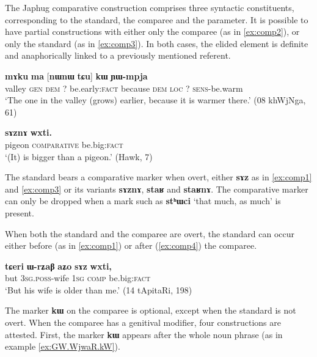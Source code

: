 \documentclass[oldfontcommands,oneside,a4paper,11pt]{article}
\newcommand{\ipa}[1]{{\phon\textbf{#1}}}
\begin{document}
 

The Japhug comparative construction comprises three syntactic constituents, corresponding to the standard, the comparee and the parameter. It is possible to have partial constructions with either only the comparee  (as in \ref{ex:comp2}), or only the standard (as in \ref{ex:comp3}). In both cases, the elided element is definite and anaphorically linked to a previously mentioned referent.

 \begin{exe}
\ex \label{ex:comp2}
\gll 
[\ipa{co}  	\ipa{ɣɯ}  	\ipa{nɯnɯ}]  	\ipa{\textbf{kɯ}}  	\ipa{mɤku}  	\ipa{ma}  	[\ipa{nɯnɯ} \ipa{tɕu}]  	\ipa{\textbf{kɯ}}  	\ipa{ɲɯ-mpja}  \\
valley \textsc{gen} \textsc{dem} ?{ } be.early:\textsc{fact} because \textsc{dem} \textsc{loc} ?{ } \textsc{sens}-be.warm \\
\glt `The one in the valley (grows) earlier, because it is warmer there.' (08 khWjNga, 61)
\end{exe}

\begin{exe}
\ex \label{ex:comp3}
\gll  \ipa{qajdo}  	\ipa{sɤznɤ}  	\ipa{wxti.}     \\
pigeon \textsc{comparative} be.big:\textsc{fact} \\
\glt `(It) is bigger than a pigeon.' (Hawk, 7)
\end{exe}


The standard  bears a comparative marker when overt, either \ipa{sɤz} as in \ref{ex:comp1} and \ref{ex:comp3} or its variants \ipa{sɤznɤ}, \ipa{staʁ} and \ipa{staʁnɤ}. The comparative marker can only be dropped when a mark such as \ipa{stʰɯci} `that much, as much' is present.
 
 When both the standard and the comparee are overt, the standard can occur either before (as in  \ref{ex:comp1}) or after (\ref{ex:comp4}) the comparee.  
 
\begin{exe}
\ex \label{ex:comp4}
\gll 
\ipa{tɕeri}  	\ipa{ɯ-rʑaβ}  	\ipa{aʑo}  	\ipa{sɤz}  	\ipa{wxti,}  \\
but \textsc{3sg.poss}-wife \textsc{1sg} \textsc{comp} be.big:\textsc{fact} \\
\glt `But his wife is older than me.' (14 tApitaRi, 198)
\end{exe}


The marker \ipa{kɯ} on the comparee is optional, except when the standard is not overt. When the comparee has a genitival modifier, four constructions are attested. First,  the marker \ipa{kɯ} appears after the whole noun phrase (as in example \ref{ex:GW.WjwaR.kW}). 
\end{document}
